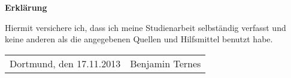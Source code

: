 \documentclass[12pt,a4paper,bibliography=totocnumbered,listof=totocnumbered,fleqn]{scrartcl}
\begin{document}
\newpage
\thispagestyle{empty}
\begin{center}
	\vspace*{5em}
	\huge\textbf{Erklärung}\\
\end{center}
\vspace{2em}
Hiermit versichere ich, dass ich meine Studienarbeit selbständig verfasst und keine anderen als die angegebenen Quellen und Hilfsmittel benutzt habe.

\vspace{4em}
\begin{minipage}{\linewidth}
	\begin{tabular}{p{15em}p{30em}}
		Dortmund, den 17.11.2013 &  Benjamin Ternes\\
	\end{tabular}
\end{minipage}
\end{document}
